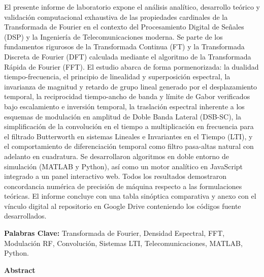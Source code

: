 \documentclass[11pt,a4paper]{article}
\begin{document}
El presente informe de laboratorio expone el an\'alisis anal\'itico, desarrollo te\'orico y validaci\'on computacional exhaustiva de las propiedades cardinales de la Transformada de Fourier en el contexto del Procesamiento Digital de Se\~nales (DSP) y la Ingenier\'ia de Telecomunicaciones moderna. Se parte de los fundamentos rigurosos de la Transformada Continua (FT) y la Transformada Discreta de Fourier (DFT) calculada mediante el algoritmo de la Transformada R\'apida de Fourier (FFT). El estudio abarca de forma pormenorizada: la dualidad tiempo-frecuencia, el principio de linealidad y superposici\'on espectral, la invarianza de magnitud y retardo de grupo lineal generado por el desplazamiento temporal, la reciprocidad tiempo-ancho de banda y l\'imite de Gabor verificados bajo escalamiento e inversi\'on temporal, la traslaci\'on espectral inherente a los esquemas de modulaci\'on en amplitud de Doble Banda Lateral (DSB-SC), la simplificaci\'on de la convoluci\'on en el tiempo a multiplicaci\'on en frecuencia para el filtrado Butterworth en sistemas Lineales e Invariantes en el Tiempo (LTI), y el comportamiento de diferenciaci\'on temporal como filtro pasa-altas natural con adelanto en cuadratura. Se desarrollaron algoritmos en doble entorno de simulaci\'on (MATLAB y Python), as\'i como un motor anal\'itico en JavaScript integrado a un panel interactivo web. Todos los resultados demostraron concordancia num\'erica de precisi\'on de m\'aquina respecto a las formulaciones te\'oricas. El informe concluye con una tabla sin\'optica comparativa y anexo con el v\'inculo digital al repositorio en Google Drive conteniendo los c\'odigos fuente desarrollados.

\vspace{0.4cm}
\noindent\textbf{Palabras Clave:} Transformada de Fourier, Densidad Espectral, FFT, Modulaci\'on RF, Convoluci\'on, Sistemas LTI, Telecomunicaciones, MATLAB, Python.

\vspace{0.8cm}
\begin{center}
  {\Large\bfseries\color{unsaBlue} Abstract}
\end{center}
\vspace{0.2cm}
\end{document}
